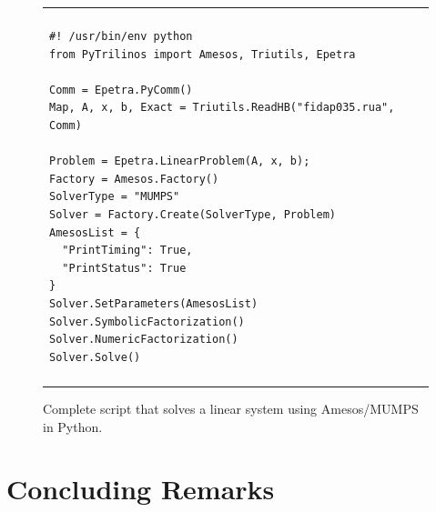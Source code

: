 \documentclass[acmtoms,acmnow]{acmtrans2m}
\newcommand{\amesos}{{\sc Amesos}}
\begin{document}
\begin{figure}
\begin{center}
\begin{tabular}{| p{12cm} |}
\hline
\\
\footnotesize
\begin{minipage}{11.5cm}
\begin{verbatim}
#! /usr/bin/env python
from PyTrilinos import Amesos, Triutils, Epetra

Comm = Epetra.PyComm()
Map, A, x, b, Exact = Triutils.ReadHB("fidap035.rua", Comm)

Problem = Epetra.LinearProblem(A, x, b);
Factory = Amesos.Factory()
SolverType = "MUMPS"
Solver = Factory.Create(SolverType, Problem)
AmesosList = {
  "PrintTiming": True,
  "PrintStatus": True
}
Solver.SetParameters(AmesosList)
Solver.SymbolicFactorization()
Solver.NumericFactorization()
Solver.Solve()
\end{verbatim}
\end{minipage}
\\
\\
\hline
\end{tabular}
\caption{Complete script that solves a linear system using \amesos/MUMPS in
  Python.}
\label{fig:pyamesos}
\end{center}
\end{figure}

\section{Concluding Remarks}
\label{sec:conclusions}
\end{document}
